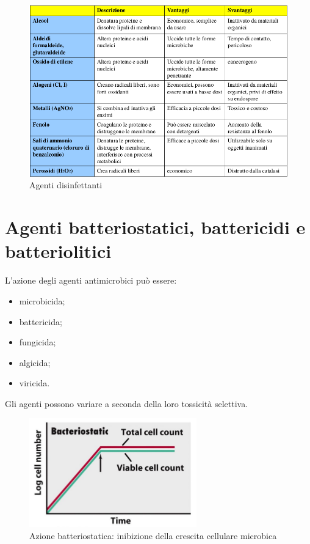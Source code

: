 \documentclass[11pt]{book}
\begin{document}
\begin{figure}[htp]
\centering
\includegraphics[scale=0.5]{img/Agenti disinfettanti.png}
\caption{Agenti disinfettanti}
\label{}
\end{figure}

\section{Agenti batteriostatici, battericidi e batteriolitici}

L'azione degli agenti antimicrobici può essere:
\begin{itemize}
\item microbicida;
\item battericida; 
\item fungicida;
\item algicida;
\item viricida.
\end{itemize}

\clearpage
Gli agenti possono variare a seconda della loro tossicità selettiva.

\begin{figure}[htp]
\centering
\includegraphics[scale=0.6]{img/Bacteriostatic.png}
\caption{Azione batteriostatica: inibizione della crescita cellulare microbica}
\label{}
\end{figure}
\end{document}
